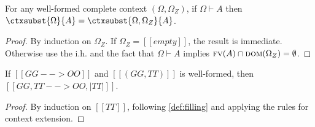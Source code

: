\begin{lemma}
  For any well-formed complete context $(\Omega, \Omega_Z)$, if $\Omega \vdash A$
  then $\ctxsubst{\Omega}{A} = \ctxsubst{\Omega,\Omega_Z}{A}$.
  \label{lemma:subst_stable}
\end{lemma}
\begin{proof}
  By induction on $\Omega_Z$. If $\Omega_Z = [[empty]]$, the result is
  immediate. Otherwise use the i.h. and the fact that $\Omega \vdash A$ implies
  $\textsc{fv}(A) \cap \textsc{dom}(\Omega_Z) = \emptyset$.
\end{proof}



\begin{lemma}   \label{lemma:filling_completes}
  If $[[GG --> OO]]$ and $[[(GG, TT)]]$ is well-formed, then $[[GG , TT --> OO, | TT |]]$.
\end{lemma}
\begin{proof}
  By induction on $[[TT]]$, following \cref{def:filling} and applying the rules for context extension.
\end{proof}

